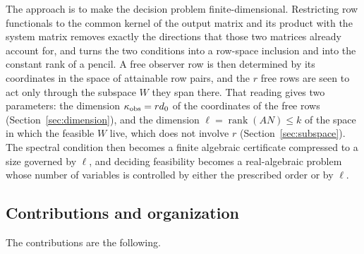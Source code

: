 \documentclass[journal]{IEEEtran}
\theoremstyle{plainn}
\theoremstyle{remark}
\begin{document}
The approach is to make the decision problem finite-dimensional. Restricting row
functionals to the common kernel of the output matrix and its product with the system
matrix removes exactly the directions that those two matrices already account for, and
turns the two conditions into a row-space inclusion and into the constant rank of a
pencil. A free observer row is then determined by its coordinates in the space of
attainable row pairs, and the $r$ free rows are seen to act only through the subspace $W$
they span there. That reading gives two parameters: the dimension $\kappa_{\rm obs}=rd_0$
of the coordinates of the free rows (Section~\ref{sec:dimension}), and the dimension
$\ell=\operatorname{rank}(AN)\le k$ of the space in which the feasible $W$ live, which does
not involve $r$ (Section~\ref{sec:subspace}). The spectral condition then becomes a finite
algebraic certificate compressed to a size governed by $\ell$, and deciding feasibility becomes a
real-algebraic problem whose number of variables is controlled by either the prescribed order or by
$\ell$.

\subsection{Contributions and organization}\label{sec:contrib}

The contributions are the following.
\end{document}
